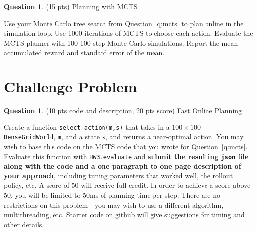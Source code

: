 \documentclass{article}
\theoremstyle{definition}
\newtheorem{question}[thm]{Question}
\begin{document}
\begin{question}
    (15 pts) Planning with MCTS

    Use your Monte Carlo tree search from Question~\ref{q:mcts} to plan online in the simulation loop. Use 1000 iterations of MCTS to choose each action. Evaluate the MCTS planner with 100 100-step Monte Carlo simulations. Report the mean accumulated reward and standard error of the mean.
\end{question}

\section{Challenge Problem}

\begin{question}
    (10 pts code and description, 20 pts score) Fast Online Planning
    
    Create a function \texttt{select\_action(m,s)} that takes in a $100 \times 100$ \texttt{DenseGridWorld}, \texttt{m}, and a state \texttt{s}, and returns a near-optimal action. You may wish to base this code on the MCTS code that you wrote for Question~\ref{q:mcts}. Evaluate this function with \texttt{HW3.evaluate} and \textbf{submit the resulting \texttt{json} file along with the code and a one paragraph to one page description of your approach}, including tuning parameters that worked well, the rollout policy, etc. A score of 50 will receive full credit. In order to achieve a score above 50, you will be limited to 50ms of planning time per step. There are no restrictions on this problem - you may wish to use a different algorithm, multithreading, etc. Starter code on github will give suggestions for timing and other details.
\end{question}
\end{document}

